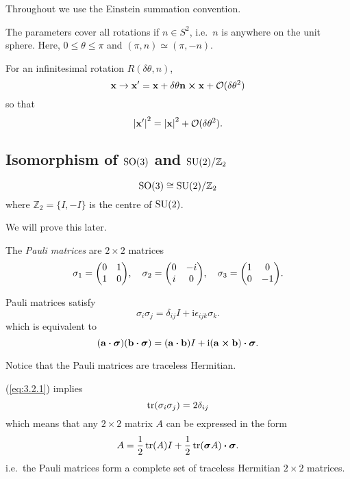 \documentclass[a4paper,11pt]{article}
\begin{document}
	\begin{nt}
		Throughout we use the Einstein summation convention.
	\end{nt}
	
	The parameters cover all rotations if $n \in S^2$, i.e.\ $n$ is anywhere on the unit sphere. Here, $0 \leq \theta \leq \pi$ and $(\pi, n) \simeq (\pi, -n)$.
	
	For an infinitesimal rotation $R(\delta \theta, n)$,
	\[
		\vb x \to \vb x' = \vb x + \delta \theta \vb n \cross \vb x + \mathcal{O}(\delta \theta^2)
	\]
	so that
	\[
		\abs{\vb x '}^2 = \abs{\vb x}^2 + \mathcal{O}(\delta \theta^2).
	\]

	\subsection{Isomorphism of $\operatorname{SO}(3)$ and $\operatorname{SU}(2)/\mathbb{Z}_2$}

	\begin{thm}
		\[
			\operatorname{SO}(3) \cong \operatorname{SU}(2)/ \mathbb{Z}_2
		\]
		where $\mathbb{Z}_2 = \{I , - I\}$ is the centre of $\operatorname{SU}(2)$.
	\end{thm}

	We will prove this later.
	
	\begin{defi}
		The \emph{Pauli matrices} are $2\times 2$ matrices
		\[
			\sigma_1 = \mqty(\pmat{1}), \quad \sigma_2 = \mqty(\pmat{2}), \quad \sigma_3 = \mqty(\pmat{3}).
		\]
	\end{defi}

	\begin{cor}
		Pauli matrices satisfy
		\begin{equation}
			\sigma_i \sigma_j = \delta _{ij} I + \mathrm{i} \epsilon _{ijk} \sigma_k.
			\label{eq:3.2.1}
		\end{equation}
		which is equivalent to
		\[
			(\vb a \vdot \bm \sigma) (\vb b \vdot \bm \sigma) = (\vb a \vdot \vb b) I + \mathrm{i} (\vb a \cross \vb b) \vdot \bm \sigma.
		\]
	\end{cor}

	Notice that the Pauli matrices are traceless Hermitian.

	\begin{prop}
		(\ref{eq:3.2.1}) implies
		\[
			\tr(\sigma_i \sigma_j) = 2 \delta _{ij}
		\]
		which means that any $2 \times 2$ matrix $A$ can be expressed in the form
		\[
			A = \frac{1}{2} \tr (A) I + \frac{1}{2} \tr(\bm \sigma A) \vdot \bm \sigma.
		\]
		i.e.\ the Pauli matrices form a complete set of traceless Hermitian $2\times 2$ matrices.
	\end{prop}
\end{document}
